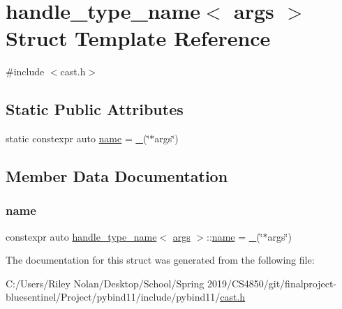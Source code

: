 \hypertarget{structhandle__type__name_3_01args_01_4}{}\section{handle\+\_\+type\+\_\+name$<$ args $>$ Struct Template Reference}
\label{structhandle__type__name_3_01args_01_4}


{\ttfamily \#include $<$cast.\+h$>$}

\subsection*{Static Public Attributes}
\begin{DoxyCompactItemize}
\item 
static constexpr auto \mbox{\hyperlink{structhandle__type__name_3_01args_01_4_a4c1617681eb26b36f3c82f27279dd043}{name}} = \mbox{\hyperlink{descr_8h_af114703e20c6527e87163eb2798f74b8}{\+\_\+}}(\char`\"{}$\ast$args\char`\"{})
\end{DoxyCompactItemize}


\subsection{Member Data Documentation}
\mbox{\label{structhandle__type__name_3_01args_01_4_a4c1617681eb26b36f3c82f27279dd043}} 
\subsubsection{\texorpdfstring{name}{name}}
{\footnotesize\ttfamily constexpr auto \mbox{\hyperlink{structhandle__type__name}{handle\+\_\+type\+\_\+name}}$<$ \mbox{\hyperlink{classargs}{args}} $>$\+::\mbox{\hyperlink{structname}{name}} = \mbox{\hyperlink{descr_8h_af114703e20c6527e87163eb2798f74b8}{\+\_\+}}(\char`\"{}$\ast$args\char`\"{})\hspace{0.3cm}{\ttfamily [static]}}



The documentation for this struct was generated from the following file\+:\begin{DoxyCompactItemize}
\item 
C\+:/\+Users/\+Riley Nolan/\+Desktop/\+School/\+Spring 2019/\+C\+S4850/git/finalproject-\/bluesentinel/\+Project/pybind11/include/pybind11/\mbox{\hyperlink{cast_8h}{cast.\+h}}\end{DoxyCompactItemize}
